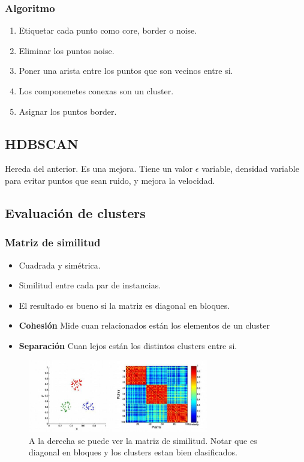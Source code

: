 \documentclass[titlepage,a4paper]{article}
\begin{document}
\subsubsection*{Algoritmo}
\begin{enumerate}
    \item Etiquetar cada punto como core, border o noise.
    \item Eliminar los puntos noise.
    \item Poner una arista entre los puntos que son vecinos entre si.
    \item Los componenetes conexas son un cluster.
    \item Asignar los puntos border.
\end{enumerate}


\subsection{HDBSCAN}
Hereda del anterior. Es una mejora. Tiene un valor $\epsilon$ variable, densidad variable para evitar puntos que sean ruido, y mejora la velocidad.

\subsection{Evaluación de clusters}

\subsubsection{Matriz de similitud}

\begin{itemize}
    \item Cuadrada y simétrica.
    \item Similitud entre cada par de instancias.
    \item El resultado es bueno si la matriz es diagonal en bloques.
    \item \textbf{Cohesión} Mide cuan relacionados están los elementos de un cluster
    \item \textbf{Separación} Cuan lejos están los distintos clusters entre si.
\end{itemize}

\begin{figure}[!htb]
    \centering
    \includegraphics[width=0.7\textwidth]{imagenesResumen/MatrizSimilitud.jpg}
    \caption{A la derecha se puede ver la matriz de similitud. Notar que es diagonal en bloques y los clusters estan bien clasificados.}
\end{figure}
\end{document}
